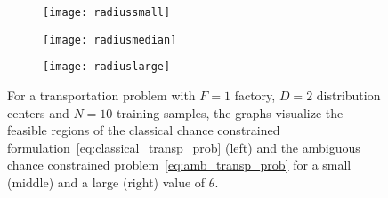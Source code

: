\documentclass[nonblindrev]{informs2017}
\newcommand{\1}[1]{\mathds{1}{\left(#1\right)}}
\begin{document}
\begin{figure}[tb]
\begin{subfigure}{.33\textwidth}
\begin{center}
\texttt{[image: radiussmall]}
\end{center}
\end{subfigure}%
\begin{subfigure}{.33\textwidth}
\begin{center}
\texttt{[image: radiusmedian]}
\end{center}
\end{subfigure}	
\begin{subfigure}{.33\textwidth}
\begin{center}
\texttt{[image: radiuslarge]}
\end{center}
\end{subfigure}
\vspace{0.2cm}
\caption{{\textnormal{For a transportation problem with $F = 1$ factory, $D = 2$ distribution centers and $N = 10$ training samples, the graphs visualize the feasible regions of the classical chance constrained formulation~\eqref{eq:classical_transp_prob} (left) and the ambiguous chance constrained problem~\eqref{eq:amb_transp_prob} for a small (middle) and a large (right) value of $\theta$.}} \label{fig:radius}}
\end{figure}
\end{document}
